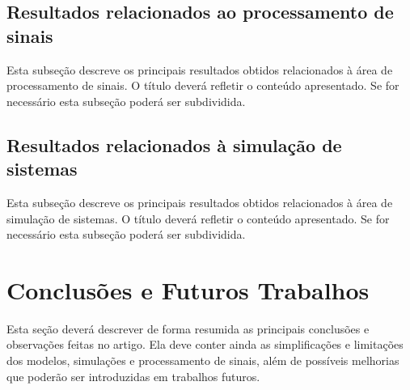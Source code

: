 \subsection{Resultados relacionados ao processamento de sinais}

Esta subseção descreve os principais resultados obtidos relacionados à área de processamento de sinais.
O título deverá refletir o conteúdo apresentado. Se for necessário esta subseção poderá ser subdividida.

\subsection{Resultados relacionados à simulação de sistemas}

Esta subseção descreve os principais resultados obtidos relacionados à área de simulação de sistemas.
O título deverá refletir o conteúdo apresentado.
Se for necessário esta subseção poderá ser subdividida.

\section{Conclusões e Futuros Trabalhos}

Esta seção deverá descrever de forma resumida as principais conclusões e observações feitas no artigo.
Ela deve conter ainda as simplificações e limitações dos modelos, simulações e processamento de sinais, além de possíveis melhorias que poderão ser introduzidas em trabalhos futuros.

\biblio